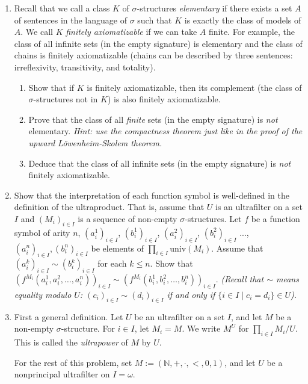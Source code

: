 \documentclass{amsart}
\theoremstyle{definition}
\begin{document}
\begin{enumerate}
\item Recall that we call a class $K$ of $\sigma$-structures \emph{elementary} if there exists a set $A$ of sentences in the language of $\sigma$ such that $K$ is exactly the class of models of $A$. We call $K$ \emph{finitely axiomatizable} if we can take $A$ finite. For example, the class of all infinite sets (in the empty signature) is elementary and the class of chains is finitely axiomatizable (chains can be described by three sentences: irreflexivity, transitivity, and totality). 
  \begin{enumerate}
  \item Show that if $K$ is finitely axiomatizable, then its complement (the class of $\sigma$-structures not in $K$) is also finitely axiomatizable.
  \item Prove that the class of all \emph{finite} sets (in the empty signature) is \emph{not} elementary. \emph{Hint: use the compactness theorem just like in the proof of the upward Löwenheim-Skolem theorem.}
  \item Deduce that the class of all infinite sets (in the empty signature) is \emph{not} finitely axiomatizable.
  \end{enumerate}
\item Show that the interpretation of each function symbol is well-defined in the definition of the ultraproduct. That is, assume that $U$ is an ultrafilter on a set $I$ and $(M_i)_{i \in I}$ is a sequence of non-empty $\sigma$-structures. Let $f$ be a function symbol of arity $n$, $(a_i^1)_{i \in I}$, $(b_i^1)_{i \in I}$, $(a_i^2)_{i \in I}$, $(b_i^2)_{i \in I}$ ..., $(a_i^n)_{i \in I}, (b_i^n)_{i \in I}$ be elements of $\prod_{i \in I} \text{univ}(M_i)$. Assume that $(a_i^k)_{i \in I} \sim (b_i^k)_{i \in I}$ for each $k \le n$. Show that $(f^{M_i} (a_i^1, a_i^2, \ldots, a_i^n))_{i \in I} \sim (f^{M_i} (b_i^1, b_i^2, \ldots, b_i^n))_{i \in I}$. \emph{(Recall that $\sim$ means equality modulo $U$: $(c_i)_{i \in I} \sim (d_i)_{i \in I}$ if and only if $\{i \in I \mid c_i = d_i\} \in U$).}
\item First a general definition. Let $U$ be an ultrafilter on a set $I$, and let $M$ be a non-empty $\sigma$-structure. For $i \in I$, let $M_i = M$. We write $M^U$ for $\prod_{i \in I} M_i / U$. This is called the \emph{ultrapower} of $M$ by $U$. 

  For the rest of this problem, set $M := (\mathbb{N}, +, \cdot, <, 0, 1)$, and let $U$ be a nonprincipal ultrafilter on $I = \omega$.


\end{enumerate}
\end{document}
